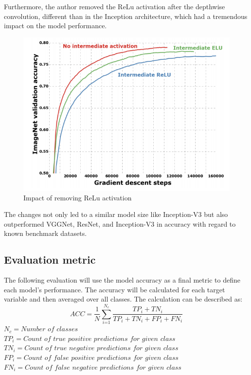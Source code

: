 Furthermore, the author removed the ReLu activation after the depthwise convolution, different than in the Inception architecture, which had a tremendous impact on the model performance.
\begin{figure}
  \centering
  \includegraphics[width=\linewidth]{figures/xception_activation.png}
  \caption{Impact of removing ReLu activation\cite{chollet2017xception}}
  \label{xception_activation}
\end{figure}

The changes not only led to a similar model size like Inception-V3 but also outperformed  VGGNet, ResNet, and Inception-V3 in accuracy with regard to known benchmark datasets\cite{chollet2017xception}.

\subsection{Evaluation metric}

The following evaluation will use the model accuracy as a final metric to define  each model's performance. The accuracy will be calculated for each target variable and then averaged over all classes. The calculation can be described as:
\begin{equation}
ACC=\frac{1}{N} \sum_\textit{i=1}^{N_\textit{c}} \displaystyle\frac{TP_{\textit{i}}+TN_{\textit{i}}}{TP_{\textit{i}}+TN_{\textit{i}}+FP_{\textit{i}}+FN_{\textit{i}}}
\end{equation}
\break
$N_\textit{c}=\textit{Number of classes}$\\
$TP_\textit{i} = \textit{Count of true positive predictions for given class}$\\
$TN_\textit{i} = \textit{Count of true negative predictions for given class}$\\
$FP_\textit{i} = \textit{Count of false positive predictions for given class}$\\
$FN_\textit{i} = \textit{Count of false negative predictions for given class}$





